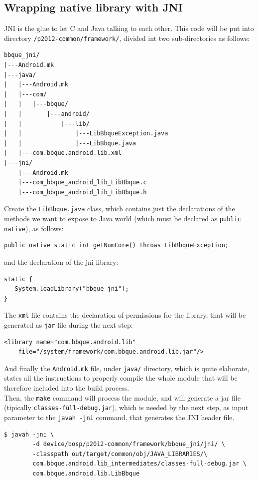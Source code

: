 \subsection{Wrapping native library with JNI}
\label{JNIwrapping}
JNI is the glue to let C and Java talking to each other. This code will be put into directory \texttt{/p2012-common/framework/}, divided int two sub-directories as follows:
\begin{verbatim}
bbque_jni/
|---Android.mk
|---java/
|   |---Android.mk
|   |---com/
|   |   |---bbque/
|   |       |---android/
|   |           |---lib/
|   |               |---LibBbqueException.java
|   |               |---LibBbque.java
|   |---com.bbque.android.lib.xml
|---jni/
    |---Android.mk
    |---com_bbque_android_lib_LibBbque.c
    |---com_bbque_android_lib_LibBbque.h
\end{verbatim}
Create the \texttt{LibBbque.java} class, which contains just the declarations of the methods we want to expose to Java world (which must be declared as \texttt{public native}), as follows:
\begin{verbatim}
public native static int getNumCore() throws LibBbqueException;
\end{verbatim}
and the declaration of the jni library:
\begin{verbatim}
static {
   System.loadLibrary("bbque_jni");
}
\end{verbatim}
The \texttt{xml} file contains the declaration of permissions for the library, that will be generated as \texttt{jar} file during the next step:
\begin{verbatim}
<library name="com.bbque.android.lib"
    file="/system/framework/com.bbque.android.lib.jar"/>
\end{verbatim}
And finally the \texttt{Android.mk} file, under \texttt{java/} directory, which is quite elaborate, states all the instructions to properly compile the whole module that will be therefore included into the build process.\\
Then, the \texttt{make} command will process the module, and will generate a jar file (tipically \texttt{classes-full-debug.jar}), which is needed by the next step, as input parameter to the \texttt{javah -jni} command, that generates the JNI header file.
\begin{verbatim}
$ javah -jni \
        -d device/bosp/p2012-common/framework/bbque_jni/jni/ \
        -classpath out/target/common/obj/JAVA_LIBRARIES/\ 
        com.bbque.android.lib_intermediates/classes-full-debug.jar \
        com.bbque.android.lib.LibBbque
\end{verbatim}
